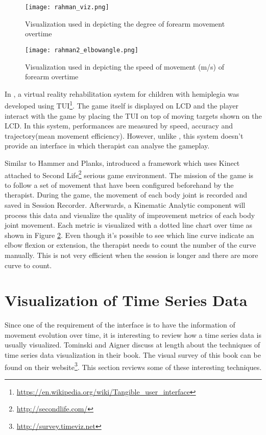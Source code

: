 \begin{figure}
\centering
\texttt{[image: rahman\_viz.png]}
\caption{Visualization used in \cite{rahman} depicting the degree of forearm movement overtime}
\label{rahman_viz}
\end{figure}

\begin{figure}
\centering
\texttt{[image: rahman2\_elbowangle.png]}
\caption{Visualization used in \cite{rahman2} depicting the speed of movement (m/s) of forearm overtime}
\label{rahman2}
\end{figure}

In \cite{green}, a virtual reality rehabilitation system for children with hemiplegia was developed using TUI\footnote{\url{https://en.wikipedia.org/wiki/Tangible_user_interface}}. The game itself is displayed on LCD and the player interact with the game by placing the TUI on top of moving targets shown on the LCD. In this system, performances are measured by speed, accuracy and trajectory(mean movement efficiency). However, unlike \cite{rahman}, this system doesn't provide an interface in which therapist can analyse the gameplay.

Similar to Hammer and Planks, \cite{rahman2} introduced a framework which uses Kinect attached to Second Life\footnote{\url{http://secondlife.com/}} serious game environment. The mission of the game is to follow a set of movement that have been configured beforehand by the therapist. During the game, the movement of each body joint  is recorded and saved in Session Recorder. Afterwards, a Kinematic Analytic component will process this data and visualize the quality of improvement metrics of each body joint movement. Each metric is visualized with a dotted line chart over time as shown in Figure \ref{rahman2}. Even though it's possible to  see which line curve indicate an elbow flexion or extension, the therapist needs to count the number of the curve manually. This is not very efficient when the session is longer and there are more curve to count.

\section{Visualization of Time Series Data}

Since one of the requirement of the interface is to have the information of movement evolution over time, it is interesting to review how a time series data is usually visualized. Tominski and Aigner discuss at length about the techniques of time series data visualization in their book\cite{aigner}. The visual survey of this book can be found on their website\footnote{\url{http://survey.timeviz.net}}. This section reviews some of these interesting techniques.


